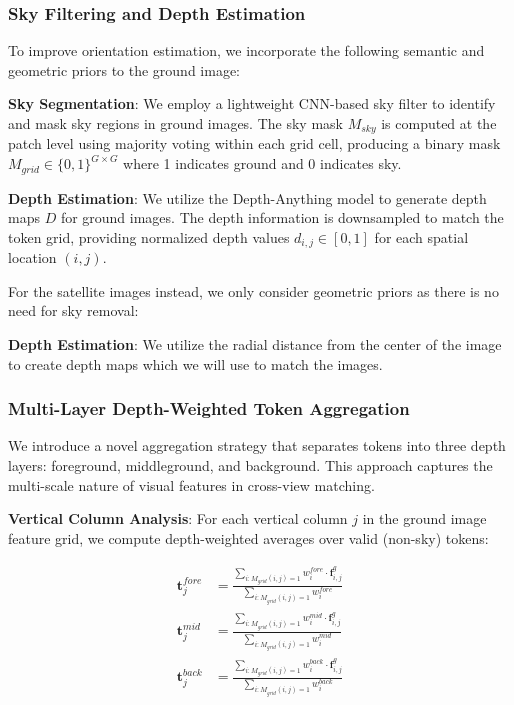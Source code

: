 \subsubsection{Sky Filtering and Depth Estimation}

To improve orientation estimation, we incorporate the following semantic and geometric priors to the ground image:

\textbf{Sky Segmentation}: We employ a lightweight CNN-based sky filter to identify and mask sky regions in ground images. The sky mask $M_{sky}$ is computed at the patch level using majority voting within each grid cell, producing a binary mask $M_{grid} \in \{0,1\}^{G \times G}$ where 1 indicates ground and 0 indicates sky.

\textbf{Depth Estimation}: We utilize the Depth-Anything model to generate depth maps $D$ for ground images. The depth information is downsampled to match the token grid, providing normalized depth values $d_{i,j} \in [0,1]$ for each spatial location $(i,j)$.

For the satellite images instead, we only consider geometric priors as there is no need for sky removal:

\textbf{Depth Estimation}: We utilize the radial distance from the center of the image to create depth maps which we will use to match the images.

\subsubsection{Multi-Layer Depth-Weighted Token Aggregation}

We introduce a novel aggregation strategy that separates tokens into three depth layers: foreground, middleground, and background. This approach captures the multi-scale nature of visual features in cross-view matching.

\textbf{Vertical Column Analysis}: For each vertical column $j$ in the ground image feature grid, we compute depth-weighted averages over valid (non-sky) tokens:

\begin{align}
\mathbf{t}_j^{fore} &= \frac{\sum_{i: M_{grid}(i,j)=1} w_i^{fore} \cdot \mathbf{f}_{i,j}^g}{\sum_{i: M_{grid}(i,j)=1} w_i^{fore}} \\
\mathbf{t}_j^{mid} &= \frac{\sum_{i: M_{grid}(i,j)=1} w_i^{mid} \cdot \mathbf{f}_{i,j}^g}{\sum_{i: M_{grid}(i,j)=1} w_i^{mid}} \\
\mathbf{t}_j^{back} &= \frac{\sum_{i: M_{grid}(i,j)=1} w_i^{back} \cdot \mathbf{f}_{i,j}^g}{\sum_{i: M_{grid}(i,j)=1} w_i^{back}}
\end{align}

